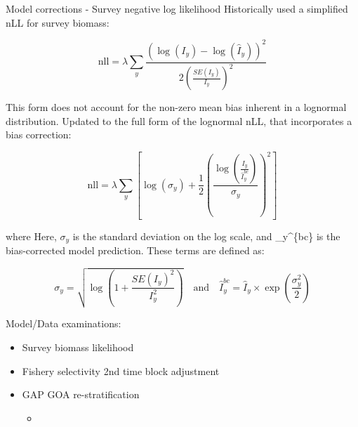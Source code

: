 \documentclass[
  ignorenonframetext,
]{beamer}
\providecommand{\tightlist}{%
  \setlength{\itemsep}{0pt}\setlength{\parskip}{0pt}}\usepackage{longtable,booktabs,array}
\newlength\Oldarrayrulewidth
\newlength\Oldtabcolsep
\begin{document}

\begin{frame}{Model corrections - Survey negative log likelihood}
\protect\hypertarget{model-corrections---survey-negative-log-likelihood}{}
Historically used a simplified nLL for survey biomass:

\begin{equation}
\text{nll} = \lambda \sum_y 
\frac{
\left( \log(I_y) - \log(\hat{I}_y) \right)^2
}{
2 \left( \frac{SE(I_y)}{I_y} \right)^2
}
\end{equation}

This form does not account for the non-zero mean bias inherent in a
lognormal distribution. Updated to the full form of the lognormal nLL,
that incorporates a bias correction:

\begin{equation}
\text{nll} = \lambda \sum_{y} \left[
\log(\sigma_y) + \frac{1}{2} \left( \frac{
\log\left( \frac{I_y}{\hat{I}_y^{bc}} \right)
}{\sigma_y} \right)^2
\right]
\end{equation}

\noindent where Here, \(\sigma_y\) is the standard deviation on the log
scale, and \_y\^{}\{bc\} is the bias-corrected model prediction.
These terms are defined as:

\begin{equation}
\sigma_y = \sqrt{ \log \left( 1 + \frac{SE(I_y)^2}{I_y^2} \right) }
\quad \text{and} \quad
\hat{I}_y^{bc} = \hat{I}_y \times \exp\left( \frac{\sigma_y^2}{2} \right)
\end{equation}
\end{frame}

\begin{frame}{Model/Data examinations:}
\protect\hypertarget{modeldata-examinations}{}
\begin{itemize}[<+->]
\tightlist
\item
  Survey biomass likelihood
\item
  Fishery selectivity 2nd time block adjustment
\item
  GAP GOA re-stratification

  \begin{itemize}[<+->]
  \tightlist
  \item
  \end{itemize}
\end{itemize}
\end{frame}
\end{document}
